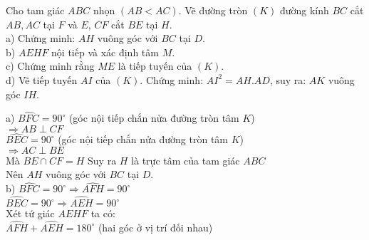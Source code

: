 \begin{ex}%
Cho tam giác $ABC$ nhọn $\left( AB<AC \right)$. Vẽ đường tròn $\left( K \right)$ đường kính $BC$ cắt $AB,AC$ tại $F$ và $E$, $CF$ cắt $BE$ tại $H$.\\
a) Chứng minh: $AH$ vuông góc với $BC$ tại $D$.\\
b) $AEHF$ nội tiếp và xác định tâm $M$.\\
c) Chứng minh rằng $ME$ là tiếp tuyến của $\left( K \right)$.\\
d) Vẽ tiếp tuyến $AI$ của $\left( K \right)$. Chứng minh: $A{{I}^{2}}=AH.AD$, suy ra: $AK$ vuông góc $IH$.
\loigiai
{
	\begin{center}
	\end{center}
		a) $\widehat{BFC}=90^\circ $ (góc nội tiếp chắn nửa đường tròn tâm $K$)\\
		$\Rightarrow AB \perp CF$ \\
		$\widehat{BEC}=90^\circ $ (góc nội tiếp chắn nửa đường tròn tâm $K$)\\
		$\Rightarrow AC \perp BE$ \\
		Mà $BE\cap CF=H$ 
		Suy ra $H$ là trực tâm của tam giác $ABC$ \\
		Nên $AH$ vuông góc với $BC$ tại $D$.\\
		b) $\widehat{BFC}=90^\circ \Rightarrow \widehat{AFH}=90^\circ $\\
		$\widehat{BEC}=90^\circ \Rightarrow \widehat{AEH}=90^\circ $\\
		Xét tứ giác $AEHF$ ta có:\\
		$\widehat{AFH}+\widehat{AEH}=180^\circ $ (hai góc ở vị trí đối nhau)\\
}
\end{ex}

